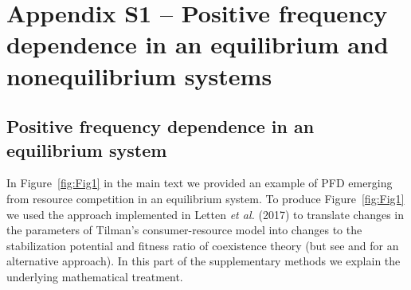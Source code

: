 \begin{comment}
\title{Coexistence theory and the frequency-dependence of priority effects}
\author[1]{Po-Ju Ke \thanks{Both authors contributed equally.}}
\author[1,2,3]{Andrew D. Letten \samethanks}
\affil[1]{Department of Biology, Stanford University, Stanford, California, 94305-5020, USA}
\affil[2]{Centre for Integrative Ecology, University of Canterbury, Christchurch, New Zealand}
\affil[3]{Institute of Integrative Biology, Department of Environmental Systems Science, ETH Z{\"u}rich, 8092 Z{\"u}rich, Switzerland}



\date{}
\maketitle
\blfootnote{Correspondence email: pojuke@stanford.edu, andrew.letten@usys.ethz.ch}
\textbf{Type of article:} Brief Communication\\
\textbf{Number of words:} 1847 [main text] \\
\textbf{References:} 17\\
\textbf{Display items:} 3\\
\end{comment}



\section{Appendix S1 -- Positive frequency dependence in an equilibrium and nonequilibrium systems}
\subsection*{Positive frequency dependence in an equilibrium system}
In Figure~\ref{fig:Fig1} in the main text we provided an example of PFD emerging from resource competition in an equilibrium system. To produce Figure~\ref{fig:Fig1} we used the approach implemented in Letten \textit{et al.} (2017) \citep{Letten2017} to translate changes in the parameters of Tilman's consumer-resource model \citep{tilman1982} into changes to the stabilization potential and fitness ratio of coexistence theory (but see \citep{Meszenaz2006} and \cite{Kleinhesselink2015} for an alternative approach). In this part of the supplementary methods we explain the underlying mathematical treatment. 
\par


